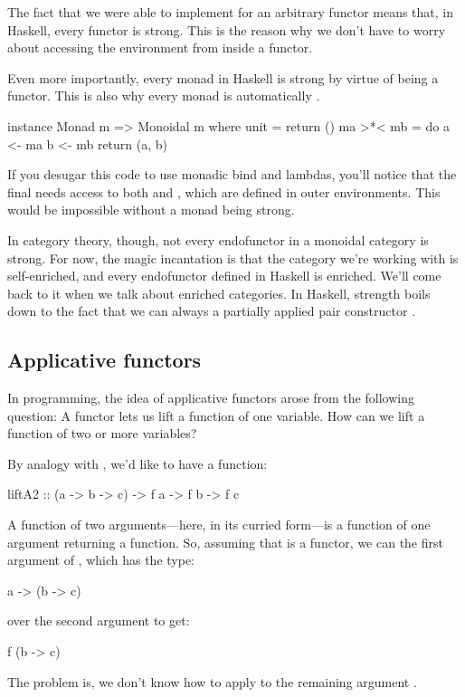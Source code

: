 \documentclass[DaoFP]{subfiles}
\begin{document}
The fact that we were able to implement  for an arbitrary functor means that, in Haskell, every functor is strong. This is the reason why we don't have to worry about accessing the environment from inside a functor.

Even more importantly, every monad in Haskell is strong by virtue of being a functor. This is also why every monad is automatically .
\begin{haskell}
instance Monad m => Monoidal m where
  unit = return ()
  ma >*< mb = do
    a <- ma
    b <- mb
    return (a, b)
\end{haskell}
If you desugar this code to use monadic bind and lambdas, you'll notice that the final  needs access to both  and , which are defined in outer environments. This would be impossible without a monad being strong.

In category theory, though, not every endofunctor in a monoidal category is strong. For now, the magic incantation is that the category we're working with is self-enriched, and every endofunctor defined in Haskell is enriched. We'll come back to it when we talk about enriched categories. In Haskell, strength boils down to the fact that we can always  a partially applied pair constructor .

\subsection{Applicative functors}

In programming, the idea of applicative functors arose from the following question: A functor lets us lift a function of one variable. How can we lift a function of two or more variables?

By analogy with , we'd like to have a function:
\begin{haskell}
liftA2 :: (a -> b -> c) -> f a -> f b -> f c
\end{haskell}

A function of two arguments---here, in its curried form---is a function of one argument returning a function. So, assuming that  is a functor, we can  the first argument of , which has the type:
\begin{haskell}
a -> (b -> c)
\end{haskell}
over the second argument  to get:
\begin{haskell}
f (b -> c)
\end{haskell}
The problem is, we don't know how to apply  to the remaining argument .
\end{document}
